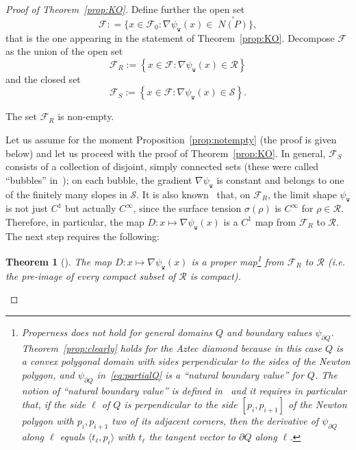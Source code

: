\documentclass[10pt]{amsart}
\newtheorem{theo}{Theorem}[section]
\theoremstyle{definition}\newtheorem{defi}[theo]{Definition}\newtheorem{rema}[theo]{Remark}\newtheorem{exam}[theo]{Example}\newtheorem{exem}[theo]{Example}\newtheorem{nota}[theo]{Notation}
\newcommand{\ttw}{\mathtt{w}}
\newcommand{\clS}{\mathcal{S}}
\newcommand{\clR}{\mathcal{R}}
\newcommand{\clF}{\mathcal{F}}
\begin{document}
\begin{proof}[Proof of Theorem~\ref{prop:KO}]
Define further the open set
\begin{equation}\label{eq:F0}
\clF: =\{x\in \clF_0:\nabla\psi_{\ttw}(x)\in \;\stackrel \circ{N(P)}\},
\end{equation}
that is the one appearing in the statement of Theorem~\ref{prop:KO}. Decompose $\clF$ as the union of the open set
\begin{equation}\label{eq:Fr}
\clF_R:=\left\{x\in \clF: \nabla\psi_{\ttw}(x)\in \clR\right\}
\end{equation}
and the closed set
\begin{equation}\label{eq:Fs}
\clF_S:=\left\{x\in \clF: \nabla\psi_{\ttw}(x)\in \clS\right\}.
\end{equation}
\begin{prop}\label{prop:notempty}
The set $\clF_R$ is non-empty.
\end{prop}

Let us assume for the moment Proposition~\ref{prop:notempty} (the proof is given below) and let us proceed with the proof of Theorem~\ref{prop:KO}. In general, $ \clF_S$ consists of a collection of disjoint, simply connected sets (these were called ``bubbles'' in~\cite{KO07}); on each bubble, the gradient $\nabla\psi_{\ttw}$ is constant and belongs to one of the finitely many slopes in $\clS$. It is also known~\cite{morrey2009multiple} that, on $ \clF_R$, the limit shape $\psi_{\ttw}$ is not just $C^1$ but actually $C^\infty$, since the surface tension $\sigma(\rho)$ is $C^\infty$ for $\rho\in \clR$. Therefore, in particular, the map $D:x\mapsto \nabla \psi_{\ttw}(x)$ is a $C^1$ map from $\clF_R$ to $\clR$. The next step requires the following:

\begin{theo}[{\cite{Duse}\label{prop:clearly}}]
The map $D:x\mapsto \nabla \psi_{\ttw}(x)$ is a proper map\footnote{\label{foot:natural}
Properness does not hold for general domains $Q$ and boundary values $\psi_{\partial Q}$. Theorem~\ref{prop:clearly} holds for the Aztec diamond because in this case $Q$ is a convex polygonal domain with sides perpendicular to the sides of the Newton polygon, and $\psi_{\partial Q}$ in~\eqref{eq:partialQ} is a ``natural boundary value'' for $Q$. The notion of ``natural boundary value'' is defined in~\cite{Duse} and it requires in particular that, if the side $\ell$ of $Q$ is perpendicular to the side $[p_i,p_{i+1}]$ of the Newton polygon with $p_i,p_{i+1}$ two of its adjacent corners, then the derivative of $\psi_{\partial Q}$ along $\ell$ equals $\langle t_\ell,p_i\rangle$ with $t_\ell$ the tangent vector to $\partial Q$ along $\ell$. } from $\clF_R$ to $\clR$ (i.e. the pre-image of every compact subset of $\clR$ is compact).
\end{theo}


\end{proof}
\end{document}

